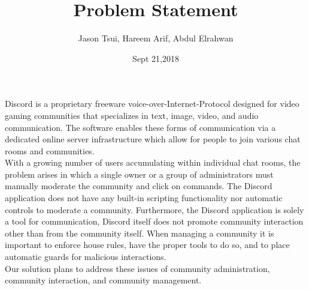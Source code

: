 \documentclass[12pt]{article}
\title{Problem Statement}
\author{Jason Tsui, Hareem Arif, Abdul Elrahwan}
\date{Sept 21,2018}
\begin{document}
\maketitle

Discord is a proprietary freeware voice-over-Internet-Protocol designed for video gaming communities that specializes in text, image, video, and audio communication. The software enables these forms of communication via a dedicated online server infrastructure which allow for people to join various chat rooms and communities. \\


With a growing number of users accumulating within individual chat rooms, the problem arises in which a single owner or a group of administrators must manually moderate the community and click on commands. The Discord application does not have any built-in scripting functionality nor automatic controls to moderate a community. Furthermore, the Discord application is solely a tool for communication, Discord itself does not promote community interaction other than from the community itself. When managing a community it is important to enforce house rules, have the proper tools to do so, and to place automatic guards for malicious interactions. \\

	Our solution plans to address these issues of community administration, community interaction, and community management.
\end{document}
